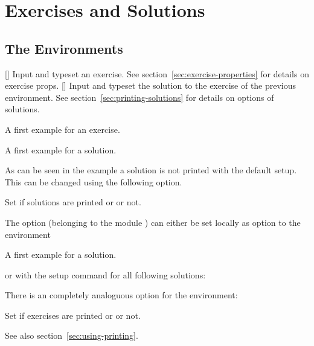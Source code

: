 \documentclass[load-preamble+]{cnltx-doc}
\begin{document}
\section{Exercises and Solutions}

\subsection{The Environments}

\begin{environments}
  []
    Input and typeset an exercise.  See section~\vref{sec:exercise-properties}
    for details on exercise \acsp*{prop}.
  []
    Input and typeset the solution to the exercise of the previous
     environment.  See section~\vref{sec:printing-solutions} for
    details on options of solutions.
\end{environments}

\begin{example}[outside]
  \begin{exercise}
    A first example for an exercise.
  \end{exercise}
  \begin{solution}
    A first example for a solution.
  \end{solution}
\end{example}

As can be seen in the example a solution is not printed with the default
setup.  This can be changed using the following option.
\begin{options}
    Set if solutions are printed or or not.
\end{options}

The option (belonging to the module ) can either be set
locally as option to the  environment
\begin{sourcecode}
  \begin{solution}[print=true]
    A first example for a solution.
  \end{solution}
\end{sourcecode}
or with the setup command for all following solutions:
\begin{sourcecode}
\end{sourcecode}

There is an completely analoguous option for the  environment:
\begin{options}
    Set if exercises are printed or or not.
\end{options}
See also section~\vref{sec:using-printing}.
\end{document}
